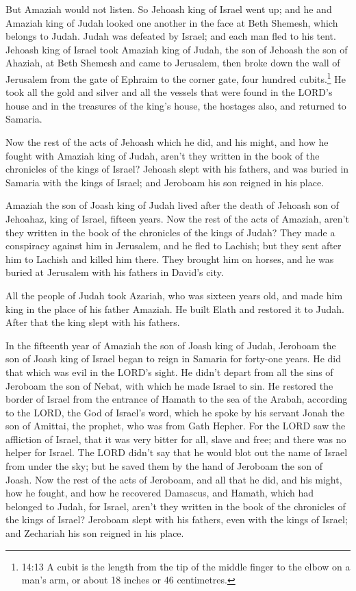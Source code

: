  But Amaziah would not listen. So Jehoash king of Israel
went up; and he and Amaziah king of Judah looked one another in the face
at Beth Shemesh, which belongs to Judah.  Judah was
defeated by Israel; and each man fled to his tent.  Jehoash
king of Israel took Amaziah king of Judah, the son of Jehoash the son of
Ahaziah, at Beth Shemesh and came to Jerusalem, then broke down the wall
of Jerusalem from the gate of Ephraim to the corner gate, four hundred
cubits.\footnote{14:13 A cubit is the length from the tip of the middle
  finger to the elbow on a man's arm, or about 18 inches or 46
  centimetres.}  He took all the gold and silver and all
the vessels that were found in the LORD's house and in the treasures of
the king's house, the hostages also, and returned to Samaria.

 Now the rest of the acts of Jehoash which he did, and his
might, and how he fought with Amaziah king of Judah, aren't they written
in the book of the chronicles of the kings of Israel? 
Jehoash slept with his fathers, and was buried in Samaria with the kings
of Israel; and Jeroboam his son reigned in his place.

 Amaziah the son of Joash king of Judah lived after the
death of Jehoash son of Jehoahaz, king of Israel, fifteen years.
 Now the rest of the acts of Amaziah, aren't they written
in the book of the chronicles of the kings of Judah?  They
made a conspiracy against him in Jerusalem, and he fled to Lachish; but
they sent after him to Lachish and killed him there.  They
brought him on horses, and he was buried at Jerusalem with his fathers
in David's city.

 All the people of Judah took Azariah, who was sixteen
years old, and made him king in the place of his father Amaziah.
 He built Elath and restored it to Judah. After that the
king slept with his fathers.

 In the fifteenth year of Amaziah the son of Joash king of
Judah, Jeroboam the son of Joash king of Israel began to reign in
Samaria for forty-one years.  He did that which was evil in
the LORD's sight. He didn't depart from all the sins of Jeroboam the son
of Nebat, with which he made Israel to sin.  He restored
the border of Israel from the entrance of Hamath to the sea of the
Arabah, according to the LORD, the God of Israel's word, which he spoke
by his servant Jonah the son of Amittai, the prophet, who was from Gath
Hepher.  For the LORD saw the affliction of Israel, that it
was very bitter for all, slave and free; and there was no helper for
Israel.  The LORD didn't say that he would blot out the
name of Israel from under the sky; but he saved them by the hand of
Jeroboam the son of Joash.  Now the rest of the acts of
Jeroboam, and all that he did, and his might, how he fought, and how he
recovered Damascus, and Hamath, which had belonged to Judah, for Israel,
aren't they written in the book of the chronicles of the kings of
Israel?  Jeroboam slept with his fathers, even with the
kings of Israel; and Zechariah his son reigned in his place.

